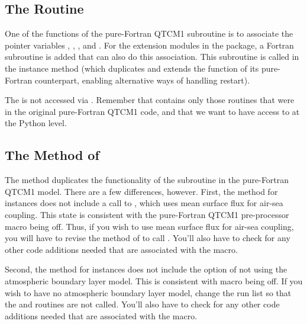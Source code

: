 	\subsection{The  Routine}

One of the functions of the pure-Fortran QTCM1 
subroutine is to associate the pointer variables , ,
, and .  For the extension modules in the 
package, a Fortran subroutine  is added that can
also do this association.  This subroutine is called in the
 instance method
%
	{}
(which duplicates and
extends the function of its pure-Fortran counterpart, enabling
alternative ways of handling restart).

The  is not accessed via .  Remember
that  contains only those routines that were in the
original pure-Fortran QTCM1 code, and that we want to have access
to at the Python level.


	\subsection{The  Method of }

The  method  duplicates the functionality
of the  subroutine in the pure-Fortran QTCM1 model.
There are a few differences, however.  First, the  method
for  instances does not include a call to ,
which uses mean surface flux for air-sea coupling.  This state is
consistent with the pure-Fortran QTCM1 pre-processor macro
 being off.  Thus, if you wish to use mean surface
flux for air-sea coupling, you will have to revise the 
method of  to call .  You'll also have to
check for any other code additions needed that are associated with
the  macro.

Second, the  method for  instances does not
include the option of not using the atmospheric boundary layer
model.  This is consistent with macro  being off.  If
you wish to have no atmospheric boundary layer model, change the
run list  so that the  and
 routines are not called.  You'll also have to check
for any other code additions needed that are associated with the
 macro.



